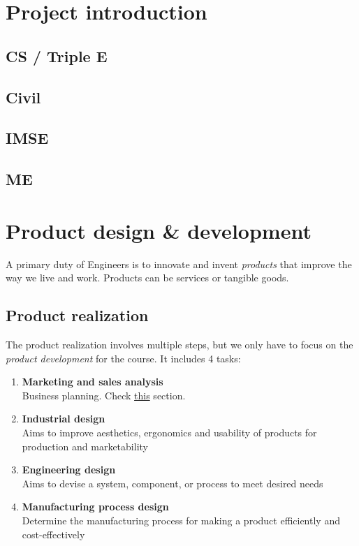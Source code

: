 \documentclass{article}
\begin{document}




\section{Project introduction}
\subsection{CS / Triple E}
\subsection{Civil}
\subsection{IMSE}
\subsection{ME}


\section{Product design \& development}
A primary duty of Engineers is to innovate and invent \emph{products} that improve the way we live and work. Products can be services or tangible goods.
\subsection{Product realization}
The product realization involves multiple steps, but we only have to focus on the \emph{product development} for the course. It includes 4 tasks:
\begin{enumerate}
      \item \textbf{Marketing and sales analysis}\\
            Business planning. Check \hyperref[sec:market]{this} section.
      \item \textbf{Industrial design}\\
            Aims to improve aesthetics, ergonomics and usability of products for production and marketability
      \item \textbf{Engineering design}\\
            Aims to devise a system, component, or process to meet desired needs
      \item \textbf{Manufacturing process design}\\
            Determine the manufacturing process for making a product efficiently and cost-effectively
\end{enumerate}
\end{document}
